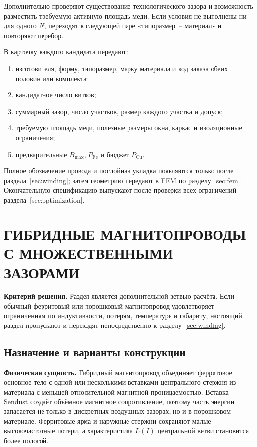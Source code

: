 \documentclass[14pt,a4paper]{extarticle}
\newcommand{\phys}{\par\noindent\textbf{Физическая сущность.} }
\newcommand{\criterion}{\par\noindent\textbf{Критерий решения.} }
\begin{document}
Дополнительно проверяют существование технологического зазора и возможность
разместить требуемую активную площадь меди. Если условия не выполнены ни для
одного $N$, переходят к следующей паре «типоразмер~-- материал» и повторяют
перебор.

В карточку каждого кандидата передают:
\begin{enumerate}
 \item изготовителя, форму, типоразмер, марку материала и код заказа
 обеих половин или комплекта;
 \item кандидатное число витков;
 \item суммарный зазор, число участков, размер каждого участка и допуск;
 \item требуемую площадь меди, полезные размеры окна, каркас и
изоляционные ограничения;
 \item предварительные $B_{\max}$, $P_{\text{Fe}}$ и бюджет
$P_{\text{Cu}}$.
\end{enumerate}

Полное обозначение провода и послойная укладка появляются только после
раздела~\ref{sec:winding}; затем геометрию передают в FEM по
разделу~\ref{sec:fem}. Окончательную спецификацию выпускают после проверки
всех ограничений раздела~\ref{sec:optimization}.

\section{ГИБРИДНЫЕ МАГНИТОПРОВОДЫ С МНОЖЕСТВЕННЫМИ ЗАЗОРАМИ}
\label{sec:hybrid-core}

\criterion Раздел является дополнительной ветвью расчёта. Если обычный
ферритовый или порошковый магнитопровод удовлетворяет ограничениям по
индуктивности, потерям, температуре и габариту, настоящий раздел пропускают
и переходят непосредственно к разделу~\ref{sec:winding}.

\subsection{Назначение и варианты конструкции}

\phys Гибридный магнитопровод объединяет ферритовое основное тело с одной
или несколькими вставками центрального стержня из материала с меньшей
относительной магнитной проницаемостью. Вставка Sendust создаёт объёмное
магнитное сопротивление, поэтому часть энергии запасается не только в
дискретных воздушных зазорах, но и в порошковом материале. Ферритовые ярма и
наружные стержни сохраняют малые высокочастотные потери, а характеристика
$L(I)$ центральной ветви становится более пологой.
\end{document}

